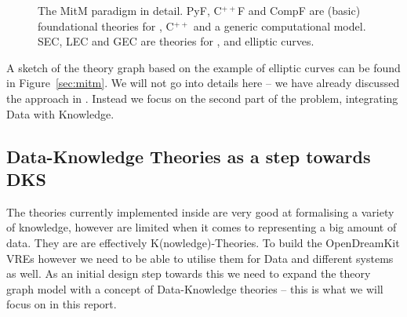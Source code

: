\begin{figure}[ht]\centering
  \def\myxscale{3}\def\myyscale{1.2}
  
  \caption{The MitM paradigm in detail. PyF, C${}^{++}$F and CompF are (basic)
    foundational theories for \python, C${}^{++}$ and a generic computational model. SEC,
    LEC and GEC are theories for \SageMath, \LMFDB and \GAP elliptic curves.}\label{fig:mitm}
\end{figure}

A sketch of the theory graph based on the example of elliptic curves can be found in
Figure~\ref{sec:mitm}. We will not go into details here -- we have already discussed the
approach in \cite{DehKohKon:iop16}. Instead we focus on the second part of the problem,
integrating Data with Knowledge.

\subsection{Data-Knowledge Theories as a step towards DKS}\label{sec:introfinal}

The theories currently implemented inside \MMT are very good at formalising a variety of
knowledge, however are limited when it comes to representing a big amount of data. They
are are effectively K(nowledge)-Theories. To build the OpenDreamKit VREs however we need
to be able to utilise them for Data and different systems as well. As an initial design
step towards this we need to expand the theory graph model with a concept of
Data-Knowledge theories -- this is what we will focus on in this report.



